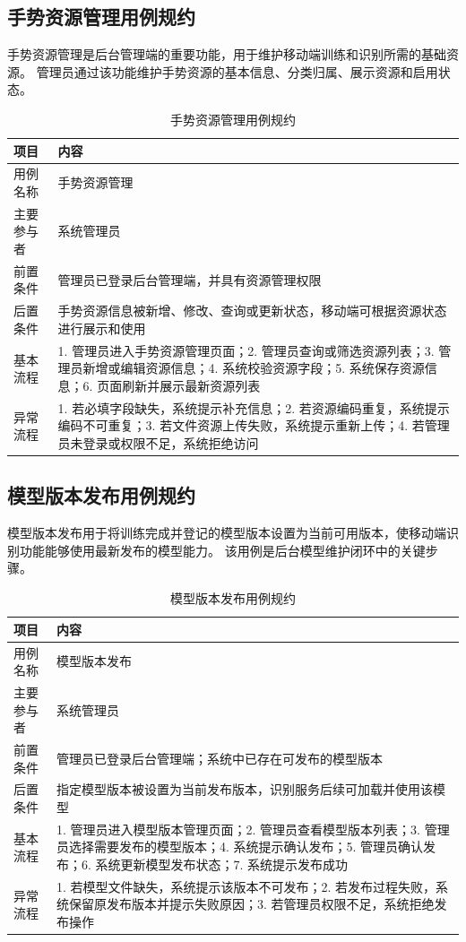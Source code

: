 \subsection{手势资源管理用例规约}

手势资源管理是后台管理端的重要功能，用于维护移动端训练和识别所需的基础资源。
管理员通过该功能维护手势资源的基本信息、分类归属、展示资源和启用状态。

\begin{longtable}{p{}p{}}
  \caption{手势资源管理用例规约}
  \label{tab:gesture-resource-usecase}\\
  \toprule
  \textbf{项目} & \textbf{内容} \\
  \midrule
  用例名称 & 手势资源管理 \\
  主要参与者 & 系统管理员 \\
  前置条件 & 管理员已登录后台管理端，并具有资源管理权限 \\
  后置条件 & 手势资源信息被新增、修改、查询或更新状态，移动端可根据资源状态进行展示和使用 \\
  基本流程 & 1. 管理员进入手势资源管理页面；2. 管理员查询或筛选资源列表；3. 管理员新增或编辑资源信息；4. 系统校验资源字段；5. 系统保存资源信息；6. 页面刷新并展示最新资源列表 \\
  异常流程 & 1. 若必填字段缺失，系统提示补充信息；2. 若资源编码重复，系统提示编码不可重复；3. 若文件资源上传失败，系统提示重新上传；4. 若管理员未登录或权限不足，系统拒绝访问 \\
  \bottomrule
\end{longtable}

\subsection{模型版本发布用例规约}

模型版本发布用于将训练完成并登记的模型版本设置为当前可用版本，使移动端识别功能能够使用最新发布的模型能力。
该用例是后台模型维护闭环中的关键步骤。

\begin{longtable}{p{}p{}}
  \caption{模型版本发布用例规约}
  \label{tab:model-publish-usecase}\\
  \toprule
  \textbf{项目} & \textbf{内容} \\
  \midrule
  用例名称 & 模型版本发布 \\
  主要参与者 & 系统管理员 \\
  前置条件 & 管理员已登录后台管理端；系统中已存在可发布的模型版本 \\
  后置条件 & 指定模型版本被设置为当前发布版本，识别服务后续可加载并使用该模型 \\
  基本流程 & 1. 管理员进入模型版本管理页面；2. 管理员查看模型版本列表；3. 管理员选择需要发布的模型版本；4. 系统提示确认发布；5. 管理员确认发布；6. 系统更新模型发布状态；7. 系统提示发布成功 \\
  异常流程 & 1. 若模型文件缺失，系统提示该版本不可发布；2. 若发布过程失败，系统保留原发布版本并提示失败原因；3. 若管理员权限不足，系统拒绝发布操作 \\
  \bottomrule
\end{longtable}
